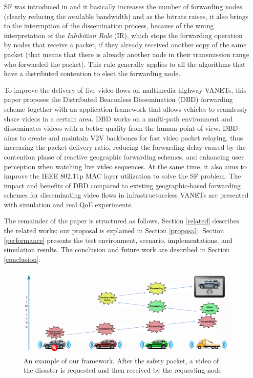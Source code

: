 \documentclass{acm_proc_article-sp}
\begin{document}
SF was introduced in \cite{VTCDeFelice} and it basically increases the number of forwarding nodes (clearly reducing the available bandwidth) and as the bitrate raises, it also brings to the interruption of the dissemination process, because of the wrong interpretation of the \textit{Inhibition Rule} (IR), which stops the forwarding operation by nodes that receive a packet, if they already received another copy of the same packet (that means that there is already another node in their transmission range who forwarded the packet). This rule generally applies to all the algorithms that have a distributed contention to elect the forwarding node.

To improve the delivery of live video flows on multimedia highway VANETs, this paper proposes the Distributed Beaconless Dissemination (DBD) forwarding scheme  together with an application framework that allows vehicles to seamlessly share videos in a certain area. DBD works on a multi-path environment and disseminates videos with a better quality from the human point-of-view. DBD aims to create and maintain V2V backbones for fast video packet relaying, thus increasing the packet delivery ratio, reducing the forwarding delay caused by the contention phase of reactive geographic forwarding schemes, and enhancing user perception when watching live video sequences. At the same time, it also aims to improve the IEEE 802.11p MAC layer utilization to solve the SF problem. The impact and benefits of DBD compared to existing geographic-based forwarding schemes for disseminating video flows in infrastructureless VANETs are presented with simulation and real QoE experiments.

The remainder of the paper is structured as follows. Section \ref{related} describes the related works; our proposal is explained in Section \ref{proposal}. Section \ref{performance} presents the test environment, scenario, implementations, and simulation results. The conclusion and future work are described in Section \ref{conclusion}.


\begin{figure}[!thb]
\begin{center}
\includegraphics[width=1.5\columnwidth]{./fig/NewBigPicture.eps}
\caption{An example of our framework. After the safety packet, a video of the disaster is requested and then received by the requesting node}
\label{fig:bigpicture}
\end{center}
\end{figure}
\end{document}
